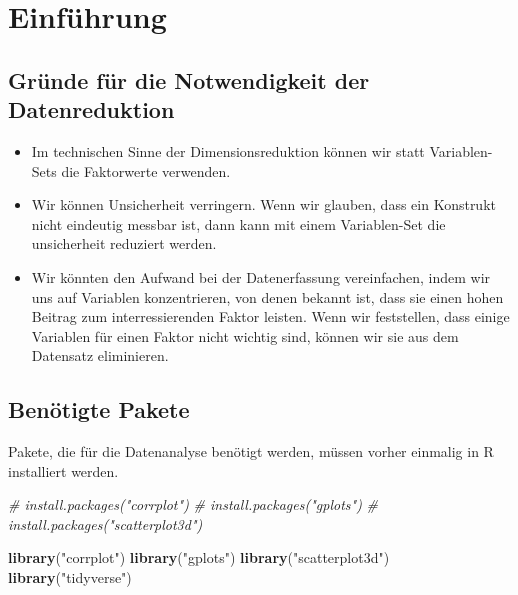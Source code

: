 \documentclass[12pt,]{book}
\makeatletter
\newenvironment{Shaded}{\begin{snugshade}}{\end{snugshade}}
\newcommand{\KeywordTok}[1]{\textcolor[rgb]{0.13,0.29,0.53}{\textbf{{#1}}}}
\newcommand{\StringTok}[1]{\textcolor[rgb]{0.31,0.60,0.02}{{#1}}}
\newcommand{\CommentTok}[1]{\textcolor[rgb]{0.56,0.35,0.01}{\textit{{#1}}}}
\newcommand{\NormalTok}[1]{{#1}}
\providecommand{\tightlist}{%
  \setlength{\itemsep}{0pt}\setlength{\parskip}{0pt}}
\newenvironment{kframe}{%
\medskip{}
\setlength{\fboxsep}{.8em}
 \def\at@end@of@kframe{}%
 \ifinner\ifhmode%
  \def\at@end@of@kframe{\end{minipage}}%
  \begin{minipage}{\columnwidth}%
 \fi\fi%
 \def\FrameCommand##1{\hskip\@totalleftmargin \hskip-\fboxsep
 \colorbox{shadecolor}{##1}\hskip-\fboxsep
     \hskip-\linewidth \hskip-\@totalleftmargin \hskip\columnwidth}%
 \MakeFramed {\advance\hsize-\width
   \@totalleftmargin\z@ \linewidth\hsize
   \@setminipage}}%
 {\par\unskip\endMakeFramed%
 \at@end@of@kframe}
\renewenvironment{Shaded}{\begin{kframe}}{\end{kframe}}
\makeatother
\begin{document}
\section{Einführung}\label{einfuhrung-1}

\subsection{Gründe für die Notwendigkeit der
Datenreduktion}\label{grunde-fur-die-notwendigkeit-der-datenreduktion}

\begin{itemize}
\tightlist
\item
  Im technischen Sinne der Dimensionsreduktion können wir statt
  Variablen-Sets die Faktorwerte verwenden.
\item
  Wir können Unsicherheit verringern. Wenn wir glauben, dass ein
  Konstrukt nicht eindeutig messbar ist, dann kann mit einem
  Variablen-Set die unsicherheit reduziert werden.
\item
  Wir könnten den Aufwand bei der Datenerfassung vereinfachen, indem wir
  uns auf Variablen konzentrieren, von denen bekannt ist, dass sie einen
  hohen Beitrag zum interressierenden Faktor leisten. Wenn wir
  feststellen, dass einige Variablen für einen Faktor nicht wichtig
  sind, können wir sie aus dem Datensatz eliminieren.
\end{itemize}

\subsection{Benötigte Pakete}\label{benotigte-pakete}

Pakete, die für die Datenanalyse benötigt werden, müssen vorher einmalig
in R installiert werden.

\begin{Shaded}
\begin{Highlighting}[]
\CommentTok{# install.packages("corrplot")}
\CommentTok{# install.packages("gplots")}
\CommentTok{# install.packages("scatterplot3d")}
\end{Highlighting}
\end{Shaded}

\begin{Shaded}
\begin{Highlighting}[]
\KeywordTok{library}\NormalTok{(}\StringTok{"corrplot"}\NormalTok{)}
\KeywordTok{library}\NormalTok{(}\StringTok{"gplots"}\NormalTok{)}
\KeywordTok{library}\NormalTok{(}\StringTok{"scatterplot3d"}\NormalTok{)}
\KeywordTok{library}\NormalTok{(}\StringTok{"tidyverse"}\NormalTok{)}
\end{Highlighting}
\end{Shaded}
\end{document}
